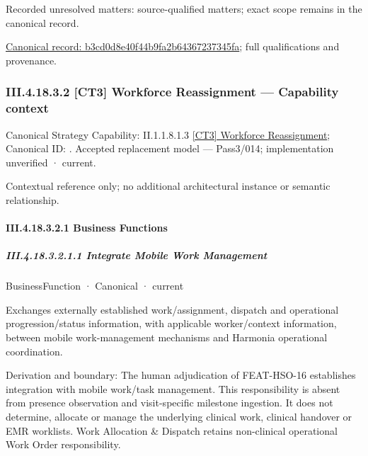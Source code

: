 {\small Recorded unresolved matters: source-qualified matters; exact scope remains in the canonical record.}\par
{\footnotesize \href{../../../../../../../continuum/business/business-service/b3cd0d8e40f44b9fa2b64367237345fa.md}{Canonical record: b3cd0d8e40f44b9fa2b64367237345fa}; full qualifications and provenance.}\par
\subsubsection*{III.4.18.3.2 [CT3] Workforce Reassignment — Capability context}
\label{navigation:III.4.18.3.2}

{\small Canonical Strategy Capability: II.1.1.8.1.3 \hyperref[element:6e450d780ab54d129d5f648aa49edd2f]{[CT3] Workforce Reassignment}; Canonical ID: \texttt{}. Accepted replacement model — Pass3/014; implementation unverified · current.}\par
Contextual reference only; no additional architectural instance or semantic relationship.\par
\paragraph*{III.4.18.3.2.1 Business Functions}
\label{navigation:III.4.18.3.2.1}

\subparagraph*{III.4.18.3.2.1.1 Integrate Mobile Work Management}
\label{navigation:III.4.18.3.2.1.1}

\label{element:81f97ad819da48f09f26029066550e08}
{\small BusinessFunction · Canonical · current}\par

Exchanges externally established work/assignment, dispatch and operational progression/status information, with applicable worker/context information, between mobile work-management mechanisms and Harmonia operational coordination.



Derivation and boundary: The human adjudication of FEAT-HSO-16 establishes integration with mobile work/task management. This responsibility is absent from presence observation and visit-specific milestone ingestion. It does not determine, allocate or manage the underlying clinical work, clinical handover or EMR worklists. Work Allocation \& Dispatch retains non-clinical operational Work Order responsibility.


